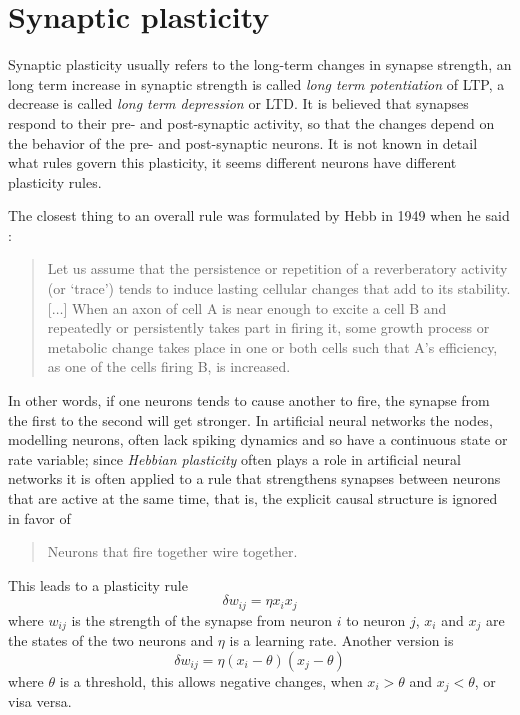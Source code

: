 \documentclass[12pt]{article}
\begin{document}
\section*{Synaptic plasticity}

Synaptic plasticity usually refers to the long-term changes in synapse
strength, an long term increase in synaptic strength is called
\textsl{long term potentiation} of LTP, a decrease is called
\textsl{long term depression} or LTD. It is believed that synapses
respond to their pre- and post-synaptic activity, so that the changes
depend on the behavior of the pre- and post-synaptic neurons. It is
not known in detail what rules govern this plasticity, it seems
different neurons have different plasticity rules. 

The closest thing to an overall rule was formulated by Hebb in 1949
when he said \cite{Hebb1949a}:
\begin{quote}
Let us assume that the persistence or repetition of a reverberatory
activity (or \lq{}trace\rq{}) tends to induce lasting cellular changes that
add to its stability. [$\ldots$] When an axon of cell A is near enough to excite
a cell B and repeatedly or persistently takes part in firing it, some
growth process or metabolic change takes place in one or both cells
such that A's efficiency, as one of the cells firing B, is increased.
\end{quote}
In other words, if one neurons tends to cause another to fire, the
synapse from the first to the second will get stronger. In artificial
neural networks the nodes, modelling neurons, often lack spiking
dynamics and so have a continuous state or rate variable; since
\textsl{Hebbian plasticity} often plays a role in artificial neural
networks it is often applied to a rule that strengthens synapses
between neurons that are active at the same time, that is, the
explicit causal structure is ignored in favor of
\begin{quote}
Neurons that fire together wire together.
\end{quote}
This leads to a plasticity rule 
\begin{equation}
\delta w_{ij}=\eta x_i x_j
\end{equation}
where $w_{ij}$ is the strength of the synapse from neuron $i$ to
neuron $j$, $x_i$ and $x_j$ are the states of the two neurons and
$\eta$ is a learning rate. Another version is
\begin{equation}
\delta w_{ij}=\eta (x_i-\theta)(x_j-\theta)
\end{equation}
where $\theta$ is a threshold, this allows negative changes, when
$x_i>\theta$ and $x_j<\theta$, or visa versa.
\end{document}
